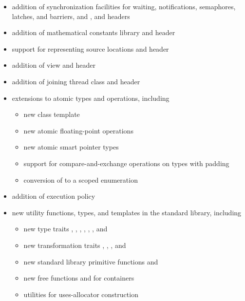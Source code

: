 \begin{itemize}
\item addition of synchronization facilities for
waiting, notifications, semaphores, latches, and barriers, and
,  and  headers
\item addition of mathematical constants library and  header
\item support for representing source locations and  header
\item addition of  view and  header
\item addition of joining thread class and  header
\item extensions to atomic types and operations, including
\begin{itemize}
  \item new class template 
  \item new atomic floating-point operations
  \item new atomic smart pointer types
  \item support for compare-and-exchange operations on types with padding
  \item conversion of  to a scoped enumeration
\end{itemize}
\item addition of  execution policy
\item new utility functions, types, and templates in the standard library, including
\begin{itemize}
  \item \raggedright new type traits
    ,
    ,
    ,
    ,
    ,
    , and
  \item new transformation traits
    ,
    ,
    , and
  \item new standard library primitive functions  and
  \item new free functions  and  for containers
  \item utilities for uses-allocator construction

\end{itemize}
\end{itemize}
